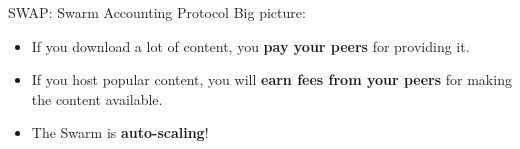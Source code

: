 \documentclass{beamer}
\begin{document}
\begin{frame}{SWAP: Swarm Accounting Protocol}
\Large{Big picture:}
\begin{itemize}
 \item<2-> If you download a lot of content, you \textbf<2>{pay your peers} for providing it.
 \item<3-> If you host popular content, you will \textbf<3>{earn fees from your peers} for making the content available.
 \item<4-> The Swarm is \textbf<4>{auto-scaling}! 
\end{itemize}
\end{frame}
\end{document}
